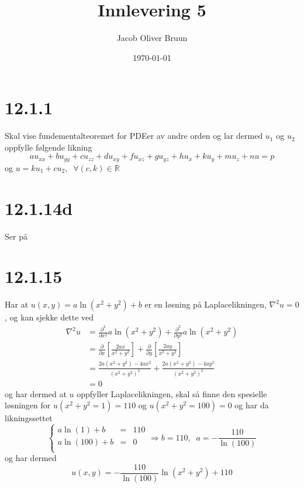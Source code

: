 \documentclass{report}
\title{Innlevering 5}
\author{Jacob Oliver Bruun}
\date{\today}
\newcommand{\M}[2]{\mathbb{#1}^{#2}}
\newcommand{\nbrack}[1]{\left( #1 \right)}
\newcommand{\bbrack}[1]{\left[ #1 \right]}
\begin{document}
\section*{12.1.1}
Skal vise fundementalteoremet for PDEer av andre orden og lar dermed $u_{1}$ og $u_{2}$ oppfylle følgende likning
\begin{equation}
  \label{eq:4}
  au_{xx} + bu_{yy} + cu_{zz} + du_{xy} + fu_{xz} + gu_{yz} + hu_{x} + ku_{y} + mu_{z} + nu = p
\end{equation}
og $u = ku_{1} + cu_{2}, \;\; \forall (c,k) \in \M{R}{}$



\section*{12.1.14d}
Ser på


\section*{12.1.15}
Har at $u(x, y) = a \ln (x^{2} + y^{2}) + b$ er en løsning på Laplacelikningen, $\nabla^{2} u = 0$, og kan sjekke dette ved
\begin{equation}
  \label{eq:1}
  \begin{split}
    \nabla^{2} u &= \frac{\partial^{2}}{\partial x^{2}} a \ln \nbrack{ x^{2} + y^{2} } + \frac{\partial^{2}}{\partial y^{2}} a \ln \nbrack{ x^{2} + y^{2} } \\
                 &= \frac{\partial}{\partial x} \bbrack{ \frac{2ax}{x^{2} + y^{2}} } + \frac{\partial}{\partial y} \bbrack{ \frac{2ay}{x^{2} + y^{2}} } \\
                 &= \frac{ 2a\nbrack{ x^{2} + y^{2} } - 4ax^{2} }{ \nbrack{ x^{2} + y^{2} }^{2} } +  \frac{ 2a\nbrack{ x^{2} + y^{2} } - 4ay^{2} }{ \nbrack{ x^{2} + y^{2} }^{2} } \\
                 &= 0
  \end{split}
\end{equation}
og har dermed at $u$ oppfyller Laplacelikningen, skal så finne den spesielle løsningen for $u \nbrack{ x^{2} + y^{2} = 1 } = 110$ og $u \nbrack{ x^{2} + y^{2} = 100 } = 0$ og har da likningssettet
\begin{equation}
  \label{eq:2}
  \left\lbrace
  \begin{array}{rcl}
    a\ln(1) + b & = & 110 \\
    a\ln(100) + b & = & 0 \\
  \end{array} \right. \Rightarrow
  b = 110, \;\; a = - \frac{110}{\ln (100)}
\end{equation}
og har dermed
\begin{equation}
  \label{eq:3}
  u(x, y) = - \frac{110}{\ln (100)} \ln\nbrack{ x^{2} + y^{2} } + 110
\end{equation}
\end{document}
